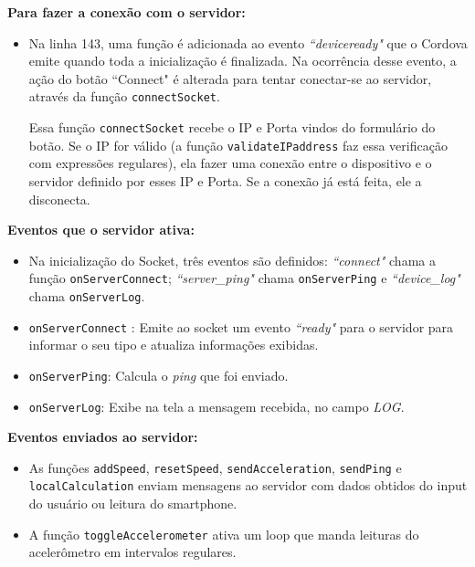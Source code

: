 \documentclass[a4paper,12pt]{article}
\newcommand{\code}[1]{\lstinline[mathescape=true, columns=fixed, basicstyle={\small\ttfamily}]{#1}}
\begin{document}
\textbf{Para fazer a conexão com o servidor:}

\begin{itemize}
  \item Na linha 143, uma função é adicionada ao evento \emph{“deviceready"} que o Cordova emite quando toda a inicialização é finalizada. Na ocorrência desse evento, a ação do botão “Connect" é alterada para tentar conectar-se ao servidor, através da função \code{connectSocket}.

Essa função \code{connectSocket} recebe o IP e Porta vindos do formulário do botão. Se o IP for válido (a função \code{validateIPaddress} faz essa verificação com expressões regulares), ela fazer uma conexão entre o dispositivo e o servidor definido por esses IP e Porta. Se a conexão já está feita, ele a disconecta.
\end{itemize}

\textbf{Eventos que o servidor ativa:}
\begin{itemize}
  \item Na inicialização do Socket, três eventos são definidos: \emph{“connect"} chama a função \code{onServerConnect}; \emph{“server\_ping"} chama \code{onServerPing} e  \emph{“device\_log"} chama \code{onServerLog}.

  \item \code{onServerConnect} : Emite ao socket um evento \emph{“ready"} para o servidor para informar o seu tipo e atualiza informações exibidas.

  \item \code{onServerPing}: Calcula o \emph{ping} que foi enviado.

  \item \code{onServerLog}: Exibe na tela a mensagem recebida, no campo \emph{LOG}.
\end{itemize}


\textbf{Eventos enviados ao servidor:}
\begin{itemize}
  \item As funções \code{addSpeed}, \code{resetSpeed}, \code{sendAcceleration}, \code{sendPing} e \code{localCalculation} enviam mensagens ao servidor com dados obtidos do input do usuário ou leitura do smartphone.

  \item A função \code{toggleAccelerometer} ativa um loop que manda leituras do acelerômetro em intervalos regulares.
\end{itemize}



\newpage
\end{document}
